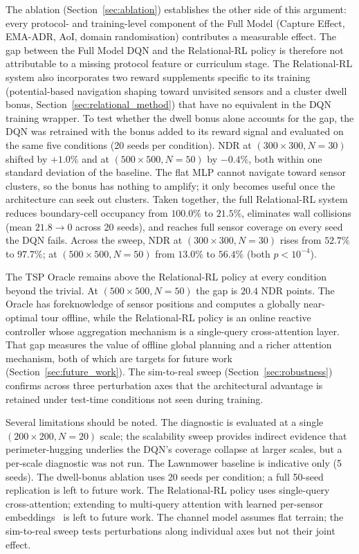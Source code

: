 The ablation (Section~\ref{sec:ablation}) establishes the other side of this argument: every protocol- and training-level component of the Full Model (Capture Effect, EMA-ADR, AoI, domain randomisation) contributes a measurable effect. The gap between the Full Model DQN and the Relational-RL policy is therefore not attributable to a missing protocol feature or curriculum stage. The Relational-RL system also incorporates two reward supplements specific to its training (potential-based navigation shaping toward unvisited sensors and a cluster dwell bonus, Section~\ref{sec:relational_method}) that have no equivalent in the DQN training wrapper. To test whether the dwell bonus alone accounts for the gap, the DQN was retrained with the bonus added to its reward signal and evaluated on the same five conditions (20 seeds per condition). NDR at $(300{\times}300, N{=}30)$ shifted by $+1.0\%$ and at $(500{\times}500, N{=}50)$ by $-0.4\%$, both within one standard deviation of the baseline. The flat MLP cannot navigate toward sensor clusters, so the bonus has nothing to amplify; it only becomes useful once the architecture can seek out clusters. Taken together, the full Relational-RL system reduces boundary-cell occupancy from $100.0\%$ to $21.5\%$, eliminates wall collisions (mean $21.8\to 0$ across 20 seeds), and reaches full sensor coverage on every seed the DQN fails. Across the sweep, NDR at $(300{\times}300, N{=}30)$ rises from $52.7\%$ to $97.7\%$; at $(500{\times}500, N{=}50)$ from $13.0\%$ to $56.4\%$ (both $p < 10^{-4}$).

The TSP Oracle remains above the Relational-RL policy at every condition beyond the trivial. At $(500{\times}500, N{=}50)$ the gap is $20.4$ NDR points. The Oracle has foreknowledge of sensor positions and computes a globally near-optimal tour offline, while the Relational-RL policy is an online reactive controller whose aggregation mechanism is a single-query cross-attention layer. That gap measures the value of offline global planning and a richer attention mechanism, both of which are targets for future work (Section~\ref{sec:future_work}). The sim-to-real sweep (Section~\ref{sec:robustness}) confirms across three perturbation axes that the architectural advantage is retained under test-time conditions not seen during training.

Several limitations should be noted. The diagnostic is evaluated at a single $(200{\times}200, N{=}20)$ scale; the scalability sweep provides indirect evidence that perimeter-hugging underlies the DQN's coverage collapse at larger scales, but a per-scale diagnostic was not run. The Lawnmower baseline is indicative only (5 seeds). The dwell-bonus ablation uses 20 seeds per condition; a full 50-seed replication is left to future work. The Relational-RL policy uses single-query cross-attention; extending to multi-query attention with learned per-sensor embeddings~\cite{kool2018attention} is left to future work. The channel model assumes flat terrain; the sim-to-real sweep tests perturbations along individual axes but not their joint effect.
